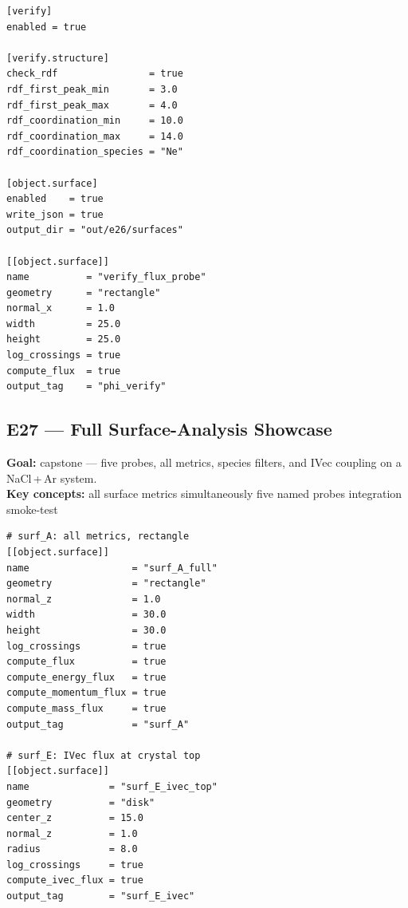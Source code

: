 \documentclass[11pt,a4paper]{article}
\begin{document}
\begin{tcolorbox}[scriptbox, scriptheader,
  title={scripts/e26\_surface\_flux\_verification.vsim (excerpt)}]
\begin{lstlisting}[style=vsimlst]
[verify]
enabled = true

[verify.structure]
check_rdf                = true
rdf_first_peak_min       = 3.0
rdf_first_peak_max       = 4.0
rdf_coordination_min     = 10.0
rdf_coordination_max     = 14.0
rdf_coordination_species = "Ne"

[object.surface]
enabled    = true
write_json = true
output_dir = "out/e26/surfaces"

[[object.surface]]
name          = "verify_flux_probe"
geometry      = "rectangle"
normal_x      = 1.0
width         = 25.0
height        = 25.0
log_crossings = true
compute_flux  = true
output_tag    = "phi_verify"
\end{lstlisting}
\end{tcolorbox}

\subsection*{E27 --- Full Surface-Analysis Showcase}

\textbf{Goal:} capstone --- five probes, all metrics, species filters, and
IVec coupling on a NaCl\,+\,Ar system.\\
\textbf{Key concepts:} all surface metrics simultaneously \textbullet{}
five named probes \textbullet{} integration smoke-test

\begin{tcolorbox}[scriptbox, scriptheader,
  title={scripts/e27\_surface\_full\_analysis\_showcase.vsim (excerpt)}]
\begin{lstlisting}[style=vsimlst]
# surf_A: all metrics, rectangle
[[object.surface]]
name                  = "surf_A_full"
geometry              = "rectangle"
normal_z              = 1.0
width                 = 30.0
height                = 30.0
log_crossings         = true
compute_flux          = true
compute_energy_flux   = true
compute_momentum_flux = true
compute_mass_flux     = true
output_tag            = "surf_A"

# surf_E: IVec flux at crystal top
[[object.surface]]
name              = "surf_E_ivec_top"
geometry          = "disk"
center_z          = 15.0
normal_z          = 1.0
radius            = 8.0
log_crossings     = true
compute_ivec_flux = true
output_tag        = "surf_E_ivec"
\end{lstlisting}
\end{tcolorbox}
\end{document}
